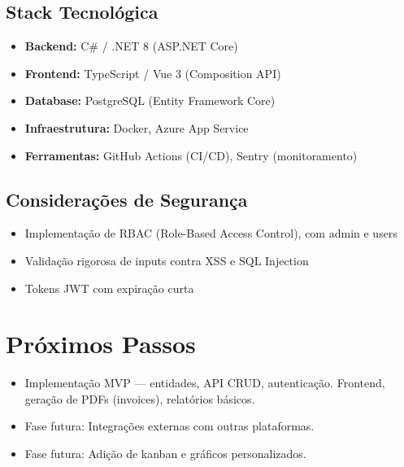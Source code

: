 \documentclass[a4paper,12pt]{article}
\begin{document}
\subsection{Stack Tecnológica}
\begin{itemize}[nosep]
  \item \textbf{Backend:} C\# / .NET 8 (ASP.NET Core)
  \item \textbf{Frontend:} TypeScript / Vue 3 (Composition API)
  \item \textbf{Database:} PostgreSQL (Entity Framework Core)
  \item \textbf{Infraestrutura:} Docker, Azure App Service
  \item \textbf{Ferramentas:} GitHub Actions (CI/CD), Sentry (monitoramento)
\end{itemize}

\subsection{Considerações de Segurança}
\begin{itemize}[nosep]
  \item Implementação de RBAC (Role-Based Access Control), com admin e users
  \item Validação rigorosa de inputs contra XSS e SQL Injection
  \item Tokens JWT com expiração curta
\end{itemize}

\section{Próximos Passos}
\begin{itemize}[nosep]
  \item Implementação MVP — entidades, API CRUD, autenticação. Frontend, geração de PDFs (invoices), relatórios básicos.  
  \item Fase futura: Integrações externas com outras plataformas.
  \item Fase futura: Adição de kanban e gráficos personalizados.
\end{itemize}

\end{document}
